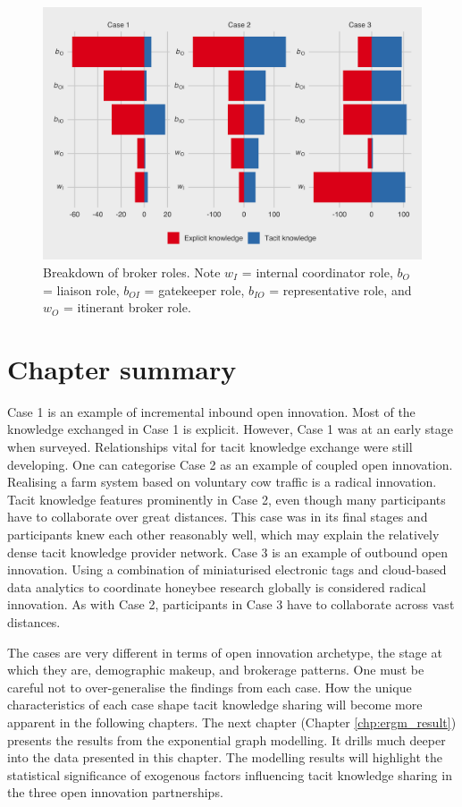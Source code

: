 \begin{figure}[hbt!]
\centering
\includegraphics[width = \linewidth]{Images/gf_brokerage.png}
\caption[Breakdown of broker roles]{Breakdown of \citet{gould1989structures} broker roles. Note $w_I$ = internal coordinator role, $b_O$ = liaison role, $b_{OI}$ = gatekeeper role, $b_{IO}$ = representative role, and $w_O$ = itinerant broker role.}
\label{fig:gf_brokerage}
\end{figure}

\section{Chapter summary}

Case 1 is an example of incremental inbound open innovation. Most of the knowledge exchanged in Case 1 is explicit. However, Case 1 was at an early stage when surveyed. Relationships vital for tacit knowledge exchange were still developing. One can categorise Case 2 as an example of coupled open innovation. Realising a farm system based on voluntary cow traffic is a radical innovation. Tacit knowledge features prominently in Case 2, even though many participants have to collaborate over great distances. This case was in its final stages and participants knew each other reasonably well, which may explain the relatively dense tacit knowledge provider network. Case 3 is an example of outbound open innovation. Using a combination of miniaturised electronic tags and cloud-based data analytics to coordinate honeybee research globally is considered radical innovation. As with Case 2, participants in Case 3 have to collaborate across vast distances. \medskip

The cases are very different in terms of open innovation archetype, the stage at which they are, demographic makeup, and brokerage patterns. One must be careful not to over-generalise the findings from each case. How the unique characteristics of each case shape tacit knowledge sharing will become more apparent in the following chapters. The next chapter (Chapter \ref{chp:ergm_result}) presents the results from the exponential graph modelling. It drills much deeper into the data presented in this chapter. The modelling results will highlight the statistical significance of exogenous factors influencing tacit knowledge sharing in the three open innovation partnerships. 